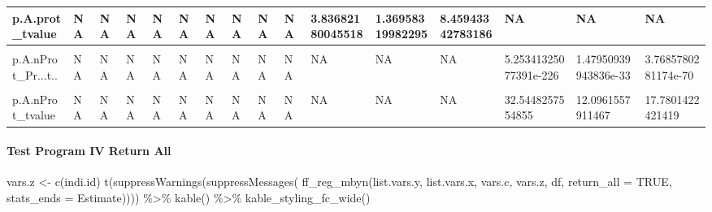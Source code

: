 \documentclass[
]{book}
\newenvironment{Shaded}{\begin{snugshade}}{\end{snugshade}}
\newcommand{\AttributeTok}[1]{\textcolor[rgb]{0.77,0.63,0.00}{#1}}
\newcommand{\ConstantTok}[1]{\textcolor[rgb]{0.00,0.00,0.00}{#1}}
\newcommand{\FunctionTok}[1]{\textcolor[rgb]{0.00,0.00,0.00}{#1}}
\newcommand{\NormalTok}[1]{#1}
\newcommand{\OtherTok}[1]{\textcolor[rgb]{0.56,0.35,0.01}{#1}}
\newcommand{\SpecialCharTok}[1]{\textcolor[rgb]{0.00,0.00,0.00}{#1}}
\newcommand{\StringTok}[1]{\textcolor[rgb]{0.31,0.60,0.02}{#1}}
\begin{document}
\begin{table}[!h]
{\begin{tabular}{l|l|l|l|l|l|l|l|l|l|l|l|l|l|l|l}
\hline
p.A.prot\_tvalue & NA & NA & NA & NA & NA & NA & NA & NA & NA & 3.83682180045518 & 1.36958319982295 & 8.45943342783186 & NA & NA & NA\\
\hline
\cellcolor{gray!6}{p.A.nProt\_Estimate} & \cellcolor{gray!6}{NA} & \cellcolor{gray!6}{NA} & \cellcolor{gray!6}{NA} & \cellcolor{gray!6}{NA} & \cellcolor{gray!6}{NA} & \cellcolor{gray!6}{NA} & \cellcolor{gray!6}{NA} & \cellcolor{gray!6}{NA} & \cellcolor{gray!6}{NA} & \cellcolor{gray!6}{NA} & \cellcolor{gray!6}{NA} & \cellcolor{gray!6}{NA} & \cellcolor{gray!6}{0.00542428867316449} & \cellcolor{gray!6}{0.779514232050632} & \cellcolor{gray!6}{0.00526237555581024}\\
\hline
p.A.nProt\_Pr...t.. & NA & NA & NA & NA & NA & NA & NA & NA & NA & NA & NA & NA & 5.25341325077391e-226 & 1.47950939943836e-33 & 3.7685780281174e-70\\
\hline
\cellcolor{gray!6}{p.A.nProt\_Std.Error} & \cellcolor{gray!6}{NA} & \cellcolor{gray!6}{NA} & \cellcolor{gray!6}{NA} & \cellcolor{gray!6}{NA} & \cellcolor{gray!6}{NA} & \cellcolor{gray!6}{NA} & \cellcolor{gray!6}{NA} & \cellcolor{gray!6}{NA} & \cellcolor{gray!6}{NA} & \cellcolor{gray!6}{NA} & \cellcolor{gray!6}{NA} & \cellcolor{gray!6}{NA} & \cellcolor{gray!6}{0.000166671307872964} & \cellcolor{gray!6}{0.06444313759758} & \cellcolor{gray!6}{0.000295969260771016}\\
\hline
p.A.nProt\_tvalue & NA & NA & NA & NA & NA & NA & NA & NA & NA & NA & NA & NA & 32.5448257554855 & 12.0961557911467 & 17.7801422421419\\
\hline
\end{tabular}}
\end{table}

\hypertarget{test-program-iv-return-all}{%
\paragraph{Test Program IV Return All}\label{test-program-iv-return-all}}

\begin{Shaded}
\begin{Highlighting}[]
\NormalTok{vars.z }\OtherTok{\textless{}{-}} \FunctionTok{c}\NormalTok{(}\StringTok{\textquotesingle{}indi.id\textquotesingle{}}\NormalTok{)}
\FunctionTok{t}\NormalTok{(}\FunctionTok{suppressWarnings}\NormalTok{(}\FunctionTok{suppressMessages}\NormalTok{(}
  \FunctionTok{ff\_reg\_mbyn}\NormalTok{(list.vars.y, list.vars.x,}
\NormalTok{            vars.c, vars.z, df,}
            \AttributeTok{return\_all =} \ConstantTok{TRUE}\NormalTok{,}
            \AttributeTok{stats\_ends =} \StringTok{\textquotesingle{}Estimate\textquotesingle{}}\NormalTok{)))) }\SpecialCharTok{\%\textgreater{}\%}
  \FunctionTok{kable}\NormalTok{() }\SpecialCharTok{\%\textgreater{}\%}
  \FunctionTok{kable\_styling\_fc\_wide}\NormalTok{()}
\end{Highlighting}
\end{Shaded}
\end{document}

